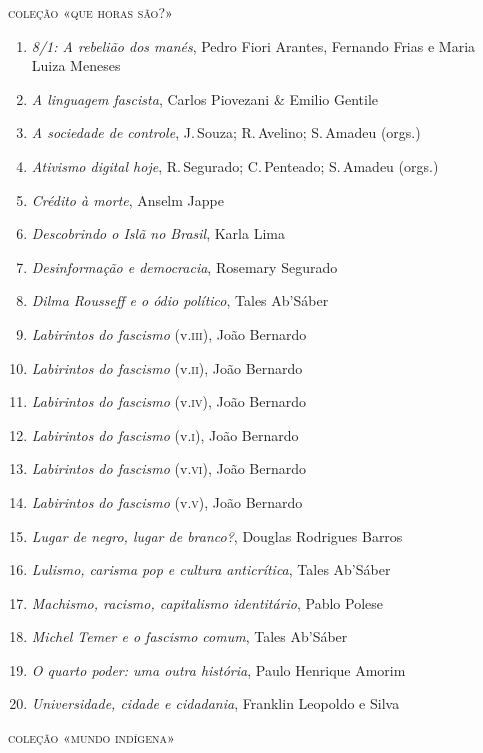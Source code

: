 \medskip
{\large\textsc{coleção «que horas são?»}}

\begin{enumerate}
\setlength\parskip{4.2pt}
\setlength\itemsep{-1.4mm}
\item \textit{8/1: A rebelião dos manés}, Pedro Fiori Arantes, Fernando Frias e Maria Luiza Meneses
\item \textit{A linguagem fascista}, Carlos Piovezani \& Emilio Gentile
\item \textit{A sociedade de controle}, J.\,Souza; R.\,Avelino; S.\,Amadeu (orgs.)
\item \textit{Ativismo digital hoje}, R.\,Segurado; C.\,Penteado; S.\,Amadeu (orgs.)
\item \textit{Crédito à morte}, Anselm Jappe
\item \textit{Descobrindo o Islã no Brasil}, Karla Lima
\item \textit{Desinformação e democracia}, Rosemary Segurado
\item \textit{Dilma Rousseff e o ódio político}, Tales Ab'Sáber
\item \textit{Labirintos do fascismo} (v.\textsc{iii}), João Bernardo
\item \textit{Labirintos do fascismo} (v.\textsc{ii}), João Bernardo
\item \textit{Labirintos do fascismo} (v.\textsc{iv}), João Bernardo
\item \textit{Labirintos do fascismo} (v.\textsc{i}), João Bernardo
\item \textit{Labirintos do fascismo} (v.\textsc{vi}), João Bernardo
\item \textit{Labirintos do fascismo} (v.\textsc{v}), João Bernardo
\item \textit{Lugar de negro, lugar de branco?}, Douglas Rodrigues Barros
\item \textit{Lulismo, carisma pop e cultura anticrítica}, Tales Ab'Sáber
\item \textit{Machismo, racismo, capitalismo identitário}, Pablo Polese
\item \textit{Michel Temer e o fascismo comum}, Tales Ab'Sáber
\item \textit{O quarto poder: uma outra história}, Paulo Henrique Amorim
\item \textit{Universidade, cidade e cidadania}, Franklin Leopoldo e Silva
\end{enumerate}

\medskip
{\large\textsc{coleção «mundo indígena»}}

